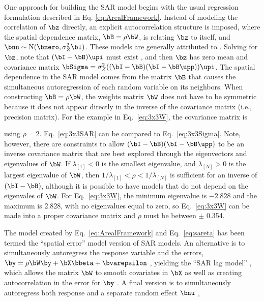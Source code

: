 One approach for building the SAR model begins with the usual regression formulation described in Eq. \ref{eq:ArealFramework}. Instead of modeling the correlation of $\bz$ directly, an explicit autocorrelation structure is imposed,
where the spatial dependence matrix, $\bB=\rho\bW$, is relating $\bz$ to itself, and $\bnu \sim \textrm{N}(\bzero,\sigma^2_Z \bI)$. These models are generally attributed to \citet{Whit:stat:1954}. Solving for $\bz$, note that $(\bI - \bB)\upi$ must exist \citep{Cres:stat:1993, Wall:Gotw:appl:2004}, and then $\bz$ has zero mean and covariance matrix $\bSigma = \sigma^2_Z((\bI - \bB)(\bI - \bB\upp))\upi$. The spatial dependence in the SAR model comes from the matrix $\bB$ that causes the simultaneous autoregression of each random variable on its neighbors. When constructing $\bB = \rho\bW$, the weights matrix $\bW$ does not have to be symmetric because it does not appear directly in the inverse of the covariance matrix (i.e., precision matrix).  For the example in Eq.~\ref{eq:3x3W}, the covariance matrix is

using $\rho = 2$. Eq.~\ref{eq:3x3SAR} can be compared to Eq.~\ref{eq:3x3Sigma}. Note, however, there are constraints to allow $(\bI - \bB)(\bI - \bB\upp)$ to be an inverse covariance matrix that are best explored through the eigenvectors and eigenvalues of $\bW$.  If $\lambda_{[1]} < 0$ is the smallest eigenvalue, and $\lambda_{[N]} > 0$ is the largest eigenvalue of $\bW$, then $1/\lambda_{[1]} < \rho < 1/\lambda_{[N]}$ is sufficient for an inverse of $(\bI - \bB)$, although it is possible to have models that do not depend on the eigenvales of $\bW$.  For Eq.~\ref{eq:3x3W}, the minimum eigenvalue is \ensuremath{-2.828} and the maximum is 2.828, with no eigenvalues equal to zero, so Eq.~\ref{eq:3x3W} can be made into a proper covariance matrix and $\rho$ must be between $\pm$ 0.354. 

The model created by Eq.~\ref{eq:ArealFramework} and Eq.~\ref{eq:sareta} has been termed the ``spatial error'' model version of SAR models.  An alternative is to simultaneously autoregress the response variable and the errors, $\by= \rho\bW\by + \bX\bbeta + \bvarepsilon$ \citep{Anse:spat:1988}, yielding the ``SAR lag model'' \citep{Kiss:Carl:spat:2008}, 
which allows the matrix $\bW$ to smooth covariates in $\bX$ as well as creating autocorrelation in the error for $\by$ \citep[e.g.,][]{Hoot:Hank:John:Alld:reco:2013}. A final version is to simultaneously autoregress both response and a separate random effect $\bnu$ \citep[e.g., ``SAR mixed model''][]{Kiss:Carl:spat:2008}, 

